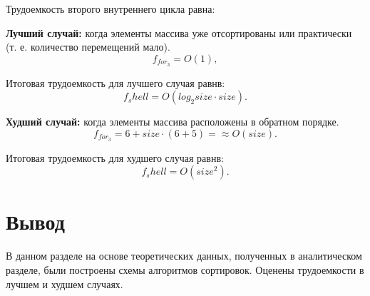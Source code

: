 Трудоемкость второго внутреннего цикла равна:

\textbf{Лучший случай:} когда элементы массива уже отсортированы или практически (т. е. количество перемещений мало).
\begin{equation}
	f_{for_3} = O(1), 
\end{equation}

Итоговая трудоемкость для лучшего случая равнв: 
\begin{equation}
	f_shell = O(log_2{size} \cdot size).
\end{equation}

\textbf{Худший случай:} когда элементы массива расположены в обратном порядке.
\begin{equation}
	f_{for_3} = 6 + size \cdot (6 + 5) = \approx O(size).
\end{equation}

Итоговая трудоемкость для худшего случая равнв: 
\begin{equation}
	f_shell = O(size^2).
\end{equation}

\section*{Вывод}
В данном разделе на основе теоретических данных, полученных в аналитическом разделе, были построены схемы алгоритмов сортировок. Оценены трудоемкости в лучшем и худшем случаях. 